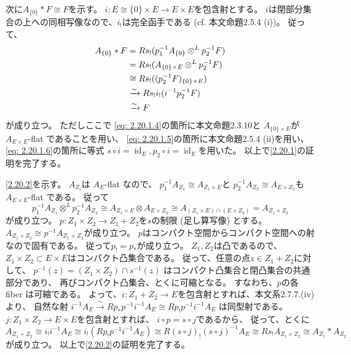 \documentclass[uplatex,dvipdfmx]{jsarticle}
\makeatletter
\theoremstyle{definition}
\renewenvironment{proof}[1][\proofname]{
  \pushQED{\qed}%
  \normalfont \topsep6\p@\@plus6\p@\relax
  \trivlist
  \item[\hskip\labelsep
    #1\@addpunct{\textbf{.}}]\ignorespaces
}{%
  \popQED\endtrivlist\@endpefalse
}
\providecommand{\proofname}{証明}
\DeclareMathOperator{\id}{\mathrm{id}}
\makeatother
\begin{document}
\begin{proof}
  次に\(A_{\{0\}}*F\cong F\)を示す。
  \(i:E\cong \{0\}\times E \to E\times E\)を包含射とする。
  \(i\)は閉部分集合の上への同相写像なので、\(i_!\)は完全函手である
  (cf. 本文命題2.5.4 (i))。
  従って、
  \begin{align}
    A_{\{0\}}*F
    &= Rs_!(p_1^{-1}A_{\{0\}}\otimes^L p_2^{-1}F) \notag \\
    &= Rs_!(A_{\{0\}\times E}\otimes^L p_2^{-1}F) \notag \\
    &\cong Rs_!((p_2^{-1}F)_{\{0\}\times E}) \label{eq: 2.20.1.4} \\
    &\xrightarrow{\sim}
    Rs_!i_!(i^{-1}p_2^{-1}F) \label{eq: 2.20.1.5} \\
    &\xrightarrow{\sim} F \label{eq: 2.20.1.6}
  \end{align}
  が成り立つ。
  ただしここで
  \eqref{eq: 2.20.1.4}の箇所に本文命題2.3.10と
  \(A_{\{0\}\times E}\)が \(A_{E\times E}\)-flat であることを用い、
  \eqref{eq: 2.20.1.5}の箇所に本文命題2.5.4 (ii)を用い、
  \eqref{eq: 2.20.1.6}の箇所に等式
  \(s\circ i = \id_E, p_2\circ i = \id_E\)を用いた。
  以上で\ref{2.20.1}の証明を完了する。

  \ref{2.20.2}を示す。
  \(A_{Z_i}\)は \(A_E\)-flat なので、
  \(p_1^{-1}A_{Z_1} \cong A_{Z_1\times E}\)と
  \(p_2^{-1}A_{Z_2} \cong A_{E\times Z_2}\)も
  \(A_{E\times E}\)-flat である。
  従って
  \[
  p_1^{-1}A_{Z_1}\otimes^L p_2^{-1}A_{Z_2} \cong
  A_{Z_1\times E}\otimes A_{E\times Z_2}
  \cong A_{(Z_1\times E)\cap (E\times Z_2)}
  = A_{Z_1\times Z_2}
  \]
  が成り立つ。
  \(p:Z_1\times Z_2\to Z_1+Z_2\)を\(s\)の制限 (足し算写像) とする。
  \(A_{Z_1\times Z_2} \cong p^{-1}A_{Z_1+Z_2}\)が成り立つ。
  \(p\)はコンパクト空間からコンパクト空間への射なので固有である。
  従って\(p_!=p_*\)が成り立つ。
  \(Z_1,Z_2\)は凸であるので、
  \(Z_1\times Z_2\subset E\times E\)はコンパクト凸集合である。
  従って、任意の点\(z\in Z_1+Z_2\)に対して、
  \(p^{-1}(z) = (Z_1\times Z_2)\cap s^{-1}(z)\)
  はコンパクト凸集合と閉凸集合の共通部分であり、
  再びコンパクト凸集合、とくに可縮となる。
  すなわち、\(p\)の各 fiber は可縮である。
  よって、\(i:Z_1+Z_2\to E\)を包含射とすれば、本文系2.7.7.(iv) より、
  自然な射
  \(i^{-1}A_E\xrightarrow{\sim} Rp_*p^{-1}i^{-1}A_E \cong Rp_!p^{-1}i^{-1}A_E\)
  は同型射である。
  \(j:Z_1\times Z_2\to E\times E\)を包含射とすれば、
  \(i\circ p = s\circ j\)であるから、
  従って、とくに
  \[
  A_{Z_1+Z_2}\cong i_!i^{-1}A_E
  \cong i_!(Rp_!p^{-1}i^{-1}A_E)
  \cong R(s\circ j)_!(s\circ j)^{-1}A_E
  \cong Rs_!A_{Z_1\times Z_2}
  \cong A_{Z_1}*A_{Z_2}
  \]
  が成り立つ。
  以上で\ref{2.20.2}の証明を完了する。


\end{proof}
\end{document}
